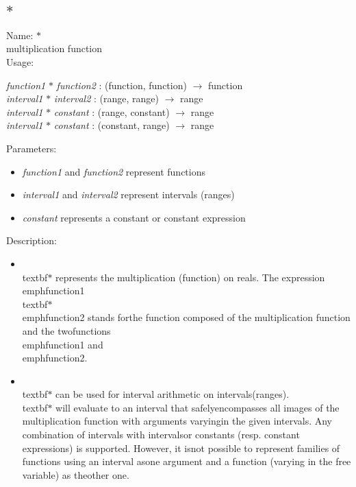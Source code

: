 \subsection{$*$}
\label{labmult}
\noindent Name: \textbf{$*$}\\
multiplication function\\
\noindent Usage: 
\begin{center}
\emph{function1} \textbf{$*$} \emph{function2} : (\textsf{function}, \textsf{function}) $\rightarrow$ \textsf{function}\\
\emph{interval1} \textbf{$*$} \emph{interval2} : (\textsf{range}, \textsf{range}) $\rightarrow$ \textsf{range}\\
\emph{interval1} \textbf{$*$} \emph{constant} : (\textsf{range}, \textsf{constant}) $\rightarrow$ \textsf{range}\\
\emph{interval1} \textbf{$*$} \emph{constant} : (\textsf{constant}, \textsf{range}) $\rightarrow$ \textsf{range}\\
\end{center}
Parameters: 
\begin{itemize}
\item \emph{function1} and \emph{function2} represent functions
\item \emph{interval1} and \emph{interval2} represent intervals (ranges)
\item \emph{constant} represents a constant or constant expression
\end{itemize}
\noindent Description: \begin{itemize}

\item \\textbf{$*$} represents the multiplication (function) on reals. \n   The expression \\emph{function1} \\textbf{$*$} \\emph{function2} stands for\n   the function composed of the multiplication function and the two\n   functions \\emph{function1} and \\emph{function2}.\n
\item \\textbf{$*$} can be used for interval arithmetic on intervals\n   (ranges). \\textbf{$*$} will evaluate to an interval that safely\n   encompasses all images of the multiplication function with arguments varying\n   in the given intervals.  Any combination of intervals with intervals\n   or constants (resp. constant expressions) is supported. However, it is\n   not possible to represent families of functions using an interval as\n   one argument and a function (varying in the free variable) as the\n   other one.\n\end{itemize}
